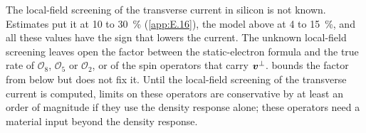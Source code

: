 The local-field screening of the transverse current in silicon is not known. Estimates put it at 10 to \SI{30}{\percent} (\cref{app:E.16}), the model above at 4 to \SI{15}{\percent}, and all these values have the sign that lowers the current. The unknown local-field screening leaves open the factor between the static-electron formula and the true rate of $\mathcal{O}_8$, $\mathcal{O}_5$ or $\mathcal{O}_2$, or of the spin operators that carry $\bm{v}^\perp$.  bounds the factor from below but does not fix it. Until the local-field screening of the transverse current is computed, limits on these operators are conservative by at least an order of magnitude if they use the density response alone; these operators need a material input beyond the density response.
